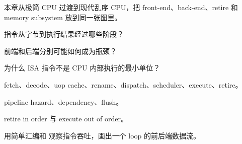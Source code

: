 {本章从极简 CPU 过渡到现代乱序 CPU，把 front-end、back-end、retire 和 memory subsystem 放到同一张图里。}
{\item 指令从字节到执行结果经过哪些阶段？
\item 前端和后端分别可能如何成为瓶颈？
\item 为什么 ISA 指令不是 CPU 内部执行的最小单位？}
{\item fetch、decode、uop cache、rename、dispatch、scheduler、execute、retire。
\item pipeline hazard、dependency、flush。
\item retire in order 与 execute out of order。}
{用简单汇编和  观察指令吞吐，画出一个 loop 的前后端数据流。}

